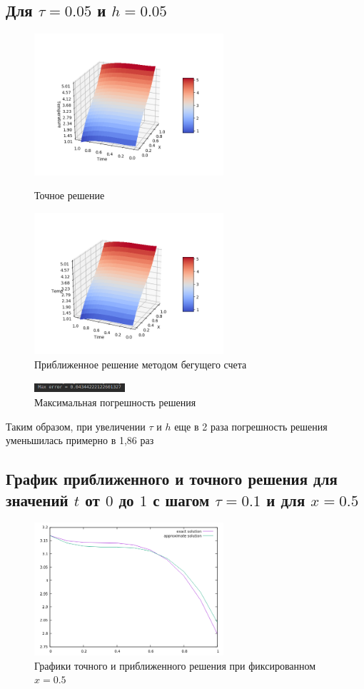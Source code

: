 \documentclass[12pt,a4paper]{scrartcl}
\begin{document}
	\subsection{Для $\tau = 0.05$ и $h = 0.05$}
	\begin{figure}[h]
		\begin{multicols}{2}
			\hfill
			\includegraphics[width=70mm]{mainFunc20-20.png}
			\hfill
			\caption{Точное решение}
			\hfill
			\includegraphics[width=70mm]{result20-20.png}
			\hfill
			\caption{Приближенное решение методом бегущего счета}
		\end{multicols}
	\end{figure}
	\begin{figure}[h]
		\centering
		\includegraphics[width=0.3\textwidth]{MaxError20-20.png}
		\caption{Максимальная погрешность решения}
	\end{figure}
	Таким образом, при увеличении $\tau$ и $h$ еще в 2 раза погрешность решения уменьшилась примерно в 1,86 раз
	\newpage
	\subsection{График приближенного и точного решения для значений $t$ от $0$ до $1$ с шагом $\tau = 0.1$ и для $x = 0.5$}
	\begin{figure}[h]
		\centering
		\includegraphics[width=70mm]{task3.png}
		\caption{Графики точного и приближенного решения при фиксированном $x=0.5$}
	\end{figure}
\end{document}
